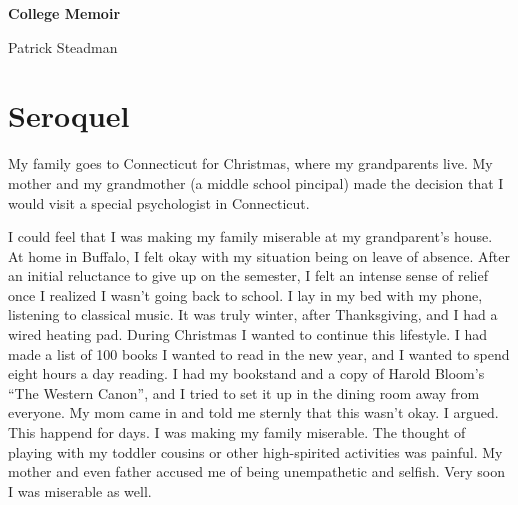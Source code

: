 \documentclass[12pt]{memoir}
\begin{document}
\vspace*{\fill}
\begin{adjustwidth}{1in}{1in}
\begin{center}
\HUGE \textbf{College Memoir}
\end{center}
\bigskip
\begin{center}
\LARGE{Patrick Steadman}\par
\end{center}
\end{adjustwidth}
\vspace*{\fill}

{}

%

\iffalse
\chapter{Seroquel}
My family goes to Connecticut for Christmas, where my grandparents live.  My
mother and my grandmother (a middle school pincipal) made the decision that I
would visit a special psychologist in Connecticut.

I could feel that I was making my family miserable at my grandparent's house.
At home in Buffalo, I felt okay with my situation being on leave of absence.
After an initial reluctance to give up on the semester, I felt an intense sense
of relief once I realized I wasn't going back to school.  I lay in my bed with my
phone, listening to classical music.  It was truly winter, after Thanksgiving,
and I had a wired heating pad.  During Christmas I wanted to continue this
lifestyle.  I had made a list of 100 books I wanted to read in the new year,
and I wanted to spend eight hours a day reading.  I had my bookstand and a copy
of Harold Bloom's ``The Western Canon'', and I tried to set it up in the dining
room away from everyone.  My mom came in and told me sternly that this wasn't
okay.  I argued.  This happend for days.  I was making my family miserable.  The
thought of playing with my toddler cousins or other high-spirited activities was
painful.  My mother and even father accused me of being unempathetic and
selfish.  Very soon I was miserable as well.
\end{document}
